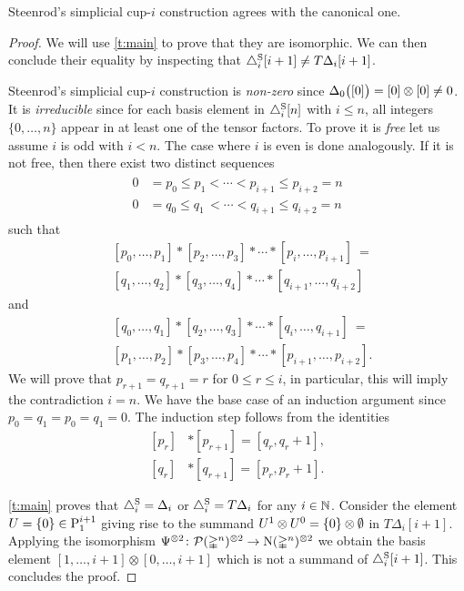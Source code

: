 \begin{theorem}\label{t:steenrod cup-i}
	Steenrod's simplicial \mbox{cup-$i$} construction agrees with the canonical one.
\end{theorem}

\begin{proof}
	We will use \cref{t:main} to prove that they are isomorphic.
	We can then conclude their equality by inspecting that $\triangle^{\mathrm{S}}_i [i+1] \neq T \Delta_i [i+1]$.

	Steenrod's simplicial \mbox{cup-$i$} construction is \emph{non-zero} since $\Delta_0\big([0]\big) = [0] \otimes [0] \neq 0$.
	It is \emph{irreducible} since for each basis element in $\triangle^{\mathrm{S}}_i [n]$ with $i \leq n$, all integers $\{0, \dots, n\}$ appear in at least one of the tensor factors.
	To prove it is \emph{free} let us assume $i$ is odd with $i < n$.
	The case where $i$ is even is done analogously.
	If it is not free, then there exist two distinct sequences
	\begin{align*}
	\begin{split}
	0 &= p_0 \leq p_1 < \cdots < p_{i+1} \leq p_{i+2} = n \\
	0 &= q_0 \leq q_1 \,< \cdots < q_{i+1} \leq q_{i+2} = n
	\end{split}
	\end{align*}
	such that
	\[
	\begin{split}
	&[ {p_0}, \dots, {p_1} ] \ast [ {p_2}, \dots, {p_3} ] \ast \cdots \ast [ {p_{i}}, \dots, {p_{i+1}} ]\ = \\
	&[ {q_1}, \dots, {q_2} ] \ast [ {q_3}, \dots, {q_4} ] \ast \cdots \ast [ {q_{i+1}}, \dots, {q_{i+2}} ]
	\end{split}
	\]
	and
	\[
	\begin{split}
	&[ {q_0}, \dots, {q_1} ] \ast [ {q_2}, \dots, {q_3} ] \ast \cdots \ast [ {q_{i}}, \dots, {q_{i+1}} ]\ = \\
	&[ {p_1}, \dots, {p_2} ] \ast [ {p_3}, \dots, {p_4} ] \ast \cdots \ast [ {p_{i+1}}, \dots, {p_{i+2}} ].
	\end{split}
	\]
	We will prove that $p_{r+1} = q_{r+1} = r$ for $0 \leq r \leq i$, in particular, this will imply the contradiction $i = n$.
	We have the base case of an induction argument since $p_0 = q_1 = p_0 = q_1 = 0$.
	The induction step follows from the identities
	\[
	\begin{split}
	[p_r] &\ast [p_{r+1}] = [q_r, q_{r}+1], \\
	[q_r] &\ast [q_{r+1}] = [p_r, p_{r}+1].
	\end{split}
	\]

	\cref{t:main} proves that $\triangle^{\mathrm{S}}_i = \Delta_i$ or $\triangle^{\mathrm{S}}_i = T \Delta_i$ for any $i \in \mathbb{N}$.
	Consider the element $U = \{0\} \in \mathrm{P}_{1}^{i+1}$ giving rise to the summand $U^1 \otimes U^0 = \{0\} \otimes \emptyset$ in $T \Delta_i [i+1]$.
	Applying the isomorphism $\Psi^{\otimes 2} \colon \mathcal{P}(\mathbb{\Delta}^n)^{\otimes 2} \to \operatorname{N}(\mathbb{\Delta}^n)^{\otimes 2}$ we obtain the basis element $[1,\dots,i+1] \otimes [0,\dots,i+1]$ which is not a summand of $\triangle^{\mathrm{S}}_i [i+1]$.
	This concludes the proof.
\end{proof}

